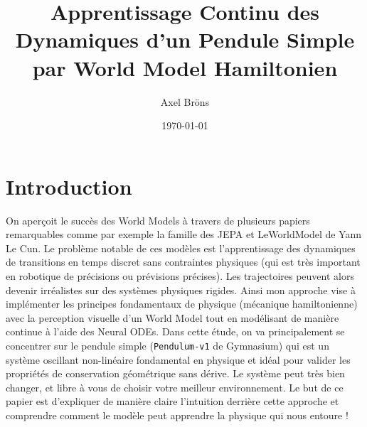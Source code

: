 \documentclass[11pt]{article}
\title{Apprentissage Continu des Dynamiques d'un Pendule Simple par World Model Hamiltonien}
\author{Axel Bröns}
\date{\today}
\begin{document}
\maketitle
%

\section{Introduction}
\label{sec:intro}
On aperçoit le succès des World Models à travers de plusieurs papiers remarquables comme par exemple la famille des JEPA et LeWorldModel de Yann Le Cun. Le problème notable de ces modèles est l'apprentissage des dynamiques de transitions en temps discret sans contraintes physiques (qui est très important en robotique de précisions ou prévisions précises). Les trajectoires peuvent alors devenir irréalistes sur des systèmes physiques rigides. Ainsi mon approche vise à implémenter les principes fondamentaux de physique (mécanique hamiltonienne) avec la perception visuelle d'un World Model tout en modélisant de manière continue à l'aide des Neural ODEs. Dans cette étude, on va principalement se concentrer sur le pendule simple (\texttt{Pendulum-v1} de Gymnasium) qui est un système oscillant non-linéaire fondamental en physique et idéal pour valider les propriétés de conservation géométrique sans dérive. Le système peut très bien changer, et libre à vous de choisir votre meilleur environnement. Le but de ce papier est d'expliquer de manière claire l'intuition derrière cette approche et comprendre comment le modèle peut apprendre la physique qui nous entoure !
\end{document}
